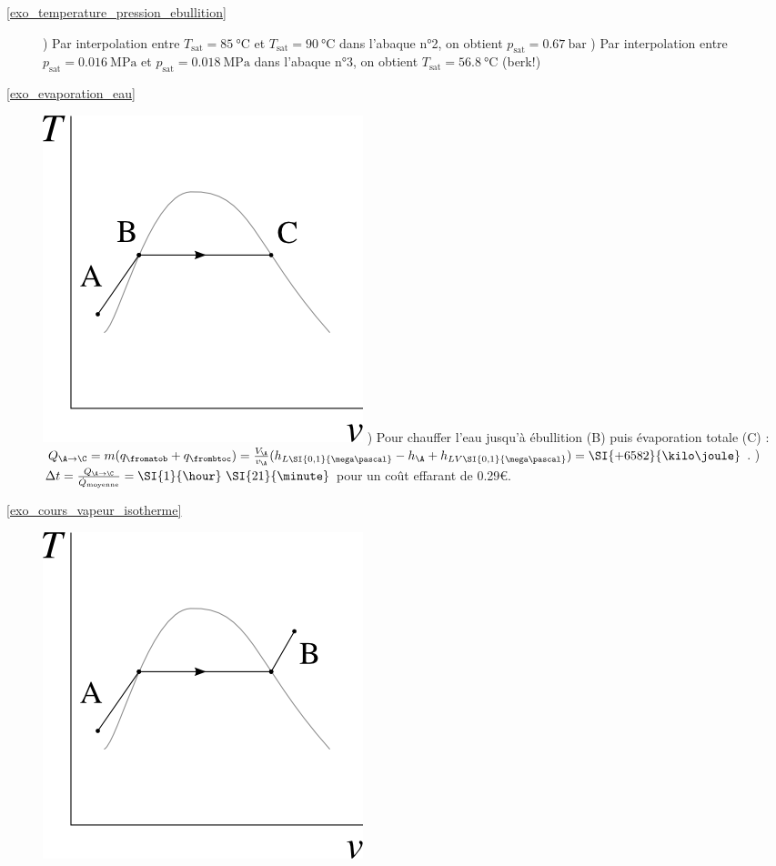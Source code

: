 \exercisesolutionpage
\titreresultats

\begin{description}
	\item [\ref{exo_temperature_pression_ebullition}]
			) Par interpolation entre $T_\text{sat} = \SI{85}{\degreeCelsius}$ et $T_\text{sat} = \SI{90}{\degreeCelsius}$ dans l’abaque n°2, on obtient $p_\text{sat} = \SI{0,67}{\bar}$
			) Par interpolation entre $p_\text{sat} = \SI{0,016}{\mega\pascal}$ et $p_\text{sat} = \SI{0,018}{\mega\pascal}$ dans l’abaque n°3, on obtient $T_\text{sat} = \SI{56,8}{\degreeCelsius}$ (berk!)
	\item [\ref{exo_evaporation_eau}]
			\includegraphics[width=\solutiondiagramwidth]{images/exo_sol_tv_ebullition.png}
			) Pour chauffer l’eau jusqu’à ébullition (B) puis évaporation totale (C) : $Q_{\A \to \C} = m (q_\fromatob + q_\frombtoc) = \frac{V_\A}{v_\A}(h_{L \SI{0,1}{\mega\pascal}} - h_\A + h_{LV \SI{0,1}{\mega\pascal}}) = \SI{+6582}{\kilo\joule}$.
			) $\Delta t = \frac{Q_{\A \to \C}}{\dot Q_\text{moyenne}} = \SI{1}{\hour} ~\SI{21}{\minute}$ pour un coût effarant de \num{0,29}\euro{}.
	\item [\ref{exo_cours_vapeur_isotherme}]
			\includegraphics[width=\solutiondiagramwidth]{images/exo_sol_tv_generation_vapeur.png}

\end{description}
